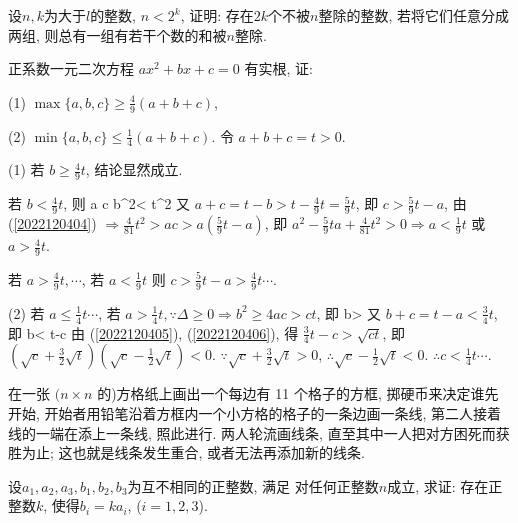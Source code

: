 \bq{}{}
设$n,k$为大于$l$的整数, $n<2^k$, 证明: 存在$2k$个不被$n$整除的整数, 若将它们任意分成两组, 则总有一组有若干个数的和被$n$整除.
\eq

\bq{}{}
正系数一元二次方程 $a x^2+b x+c=0$ 有实根, 证:

(1) $\max \{a, b, c\} \geq \frac{4}{9}(a+b+c)$,

(2) $\min \{a, b, c\} \leq \frac{1}{4}(a+b+c)$.
\eq
\ba
令 $a+b+c=t>0$. 

(1) 若 $b \geq \frac{4}{9} t$, 结论显然成立.

若 $b<\frac{4}{9} t$, 则
\be\label{2022120404}
\because \Delta {} \Longrightarrow a c \leq {} b^2< t^2
\ee
又 $a+c=t-b>t-\frac{4}{9} t=\frac{5}{9} t$, 即 $c>\frac{5}{9} t-a$, 由 (\ref{2022120404}) $\Longrightarrow \frac{4}{81} t^2>a c>a\left(\frac{5}{9} t-a\right)$, 即 $a^2-\frac{5}{9} t a+\frac{4}{81} t^2>0 \Longrightarrow a<\frac{1}{9} t$ 或 $a>\frac{4}{9} t$. 

若 $a>\frac{4}{9} t, \cdots$, 若 $a<\frac{1}{9} t$ 则 $c>\frac{5}{9} t-a>\frac{4}{9} t \cdots$.

(2) 若 $a \leq \frac{1}{4} t \cdots$, 若 $a>\frac{1}{4} t, \because \Delta \geq 0 \Longrightarrow b^2 \geq 4 a c>c t$, 即
\be\label{2022120405}
b>
\ee
又 $b+c=t-a<\frac{3}{4} t$, 即
\be\label{2022120406}
b< t-c
\ee
由 (\ref{2022120405}), (\ref{2022120406}), 得 $\frac{3}{4} t-c>\sqrt{c t}$, 
即 $\left(\sqrt{c}+\frac{3}{2} \sqrt{t}\right)\left(\sqrt{c}-\frac{1}{2} \sqrt{t}\right)<0$. 
$\because \sqrt{c}+\frac{3}{2} \sqrt{t}>0$, 
$\therefore \sqrt{c}-\frac{1}{2} \sqrt{t}<0$. 
$\therefore c<\frac{1}{4} t \cdots$.
\ea

\bq{}{}
在一张 $(n \times n$ 的)方格纸上画出一个每边有 11 个格子的方框, 掷硬币来决定谁先开始, 开始者用铅笔沿着方框内一个小方格的格子的一条边画一条线, 第二人接着线的一端在添上一条线, 照此进行. 两人轮流画线条, 直至其中一人把对方困死而获胜为止; 这也就是线条发生重合, 或者无法再添加新的线条.
\begin{center}
\end{center}
\eq

\bq{}{}
设$a_{1},a_{2},a_{3},b_{1},b_{2},b_{3}$为互不相同的正整数, 满足
\bee
\left[(n+1)a_{1}^{n}+na_{2}^{n}+(n-1)a_{3}^{n}\right]\mid\left[(n+1)b_{1}^{n}+nb_{2}^{n}+(n-1)b_{3}^{n}\right]
\eee
对任何正整数$n$成立, 求证: 存在正整数$k$, 使得$b_{i}=ka_{i}$, ($i=1,2,3$).
\eq

